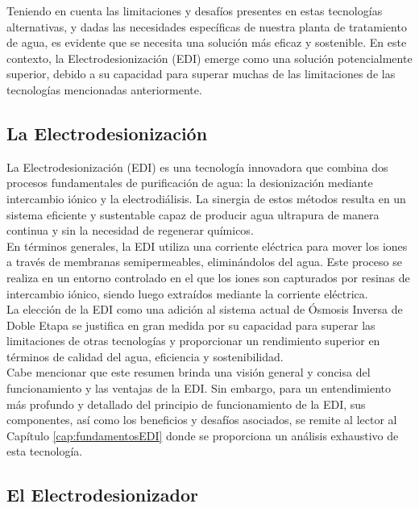 Teniendo en cuenta las limitaciones y desafíos presentes en estas tecnologías alternativas, y
dadas las necesidades específicas de nuestra planta de tratamiento de agua, es evidente que se
necesita una solución más eficaz y sostenible. En este contexto, la Electrodesionización (EDI)
emerge como una solución potencialmente superior, debido a su capacidad para superar muchas de las
limitaciones de las tecnologías mencionadas anteriormente.

\subsection{La Electrodesionización}

La Electrodesionización (EDI) es una tecnología innovadora que combina dos procesos
fundamentales de purificación de agua: la desionización mediante intercambio iónico y
la electrodiálisis. La sinergia de estos métodos resulta en un sistema eficiente y
sustentable capaz de producir agua ultrapura de manera continua y sin la necesidad
de regenerar químicos.\\

En términos generales, la EDI utiliza una corriente eléctrica para mover los iones a
través de membranas semipermeables, eliminándolos del agua. Este proceso se realiza
en un entorno controlado en el que los iones son capturados por resinas de intercambio
iónico, siendo luego extraídos mediante la corriente eléctrica.\\

La elección de la EDI como una adición al sistema actual de Ósmosis Inversa de Doble
Etapa se justifica en gran medida por su capacidad para superar las limitaciones de
otras tecnologías y proporcionar un rendimiento superior en términos de calidad del
agua, eficiencia y sostenibilidad.\\

Cabe mencionar que este resumen brinda una visión general y concisa del funcionamiento y
las ventajas de la EDI. Sin embargo, para un entendimiento más profundo y detallado del
principio de funcionamiento de la EDI, sus componentes, así como los beneficios y
desafíos asociados, se remite al lector al Capítulo \ref{cap:fundamentosEDI} donde se proporciona un
análisis exhaustivo de esta tecnología.\\

\subsection{El Electrodesionizador}

